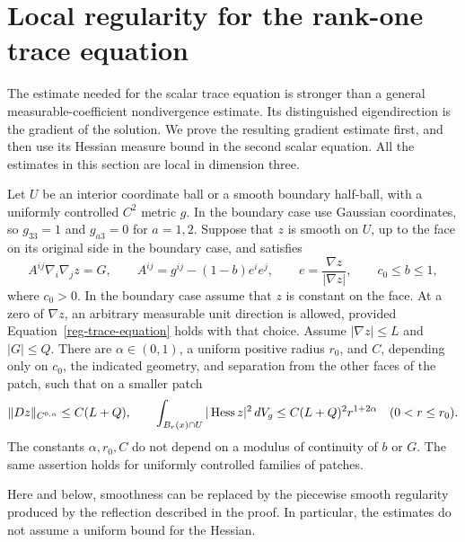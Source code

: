 \section{Local regularity for the rank-one trace equation}
\label{reg-section}

The estimate needed for the scalar trace equation is stronger than a
general measurable-coefficient nondivergence estimate. Its distinguished
eigendirection is the gradient of the solution. We prove the resulting
gradient estimate first, and then use its Hessian measure bound in the
second scalar equation. All the estimates in this section are local in
dimension three.

\begin{theorem}
\label{reg-rank-one}
Let $U$ be an interior coordinate ball or a smooth boundary half-ball,
with a uniformly controlled $C^2$ metric $g$. In the boundary case use
Gaussian coordinates, so $g_{33}=1$ and $g_{a3}=0$ for $a=1,2$.
Suppose that $z$ is smooth on $U$, up to the face on its original side
in the boundary case, and satisfies
\begin{equation}
 A^{ij}\nabla_i\nabla_j z=G,\qquad
 A^{ij}=g^{ij}-(1-b)e^i e^j,\qquad
 e=\frac{\nabla z}{|\nabla z|},\qquad c_0\le b\le1,
 \label{reg-trace-equation}
\end{equation}
where $c_0>0$. In the boundary case assume that $z$ is constant on
the face. At a zero of $\nabla z$, an arbitrary measurable unit
direction is allowed, provided Equation~\eqref{reg-trace-equation}
holds with that choice. Assume $|\nabla z|\le L$ and $|G|\le Q$.
There are $\alpha\in(0,1)$, a uniform positive radius $r_0$, and $C$,
depending only on $c_0$, the indicated geometry, and separation from
the other faces of the patch, such that on a smaller patch
\begin{equation}
 \|Dz\|_{C^{0,\alpha}}\le C(L+Q),\qquad
 \int_{B_r(x)\cap U}|\operatorname{Hess} z|^2\,dV_g
       \le C(L+Q)^2r^{1+2\alpha}\quad(0<r\le r_0).
 \label{reg-main-estimates}
\end{equation}
The constants $\alpha,r_0,C$ do not depend on a modulus of continuity
of $b$ or $G$.
The same assertion holds for uniformly controlled families of patches.
\end{theorem}

Here and below, smoothness can be replaced by the piecewise smooth
regularity produced by the reflection described in the proof. In
particular, the estimates do not assume a uniform bound for the Hessian.

